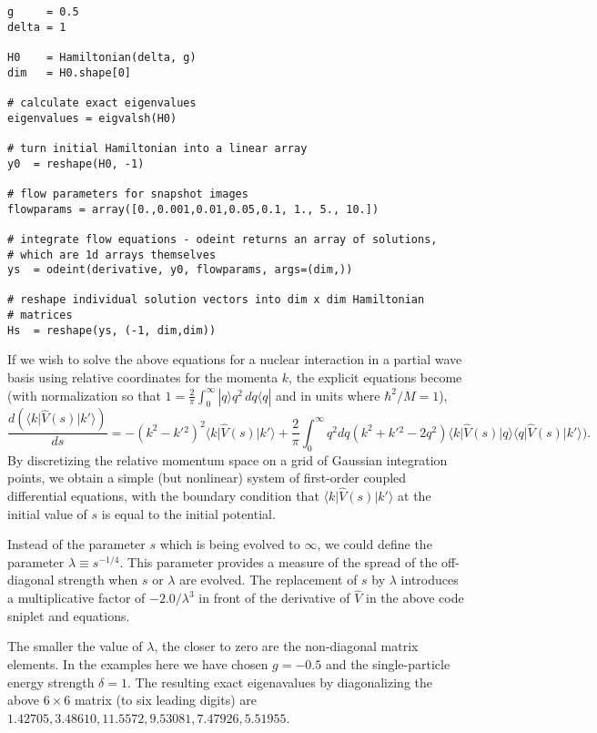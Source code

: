 \begin{lstlisting}
g     = 0.5
delta = 1

H0    = Hamiltonian(delta, g)
dim   = H0.shape[0]

# calculate exact eigenvalues
eigenvalues = eigvalsh(H0)

# turn initial Hamiltonian into a linear array
y0  = reshape(H0, -1)                 

# flow parameters for snapshot images
flowparams = array([0.,0.001,0.01,0.05,0.1, 1., 5., 10.])

# integrate flow equations - odeint returns an array of solutions,
# which are 1d arrays themselves
ys  = odeint(derivative, y0, flowparams, args=(dim,))

# reshape individual solution vectors into dim x dim Hamiltonian
# matrices
Hs  = reshape(ys, (-1, dim,dim))
\end{lstlisting}

If we wish to solve the above equations for a nuclear interaction in a
partial wave basis using relative coordinates for the momenta $k$, the explicit equations
become \cite{Bogner:2007od} (with normalization
so that $1 = \frac{2}{\pi}\int_0^\infty|q\rangle q^2\,dq \langle q |$
and in units where $\hbar^2/M = 1$),
%
\begin{equation}
  \frac{d(\langle k \vert \hat{V}(s) \vert k'\rangle)}{ds} =- (k^2 - k'{}^2)^2\langle k \vert \hat{V}(s) \vert k'\rangle
    + \frac{2}{\pi}\int_0^{\infty}q^2dq
      (k^2 + k'{}^2 - 2q^2)\langle k \vert \hat{V}(s) \vert q\rangle\langle q \vert \hat{V}(s) \vert k'\rangle).
\end{equation}
By discretizing the relative momentum space on a grid of Gaussian integration points, 
we obtain a simple (but nonlinear) system of first-order
coupled differential equations,
with the boundary condition that $\langle k \vert \hat{V}(s) \vert k'\rangle$ at the initial
value of $s$ is equal to the initial potential.

Instead of the parameter $s$ which is being evolved to $\infty$, we could define 
the parameter $\lambda \equiv s^{-1/4}$. This parameter  provides a measure of the
spread of the off-diagonal strength when $s$ or $\lambda$ are evolved. The replacement of $s$ by $\lambda$ introduces a multiplicative factor 
of $-2.0/\lambda^3$ in front of the derivative of $\hat{V}$ in the above code sniplet and equations. 

\tbd{[...]}

The smaller the value of $\lambda$, the closer to zero are the non-diagonal matrix elements. 
In the examples here we have chosen 
$g=-0.5$ and the single-particle energy strength $\delta=1$. The resulting exact eigenavalues by diagonalizing the above $6\times 6$ matrix (to six leading digits) are
$1.42705,   3.48610,  11.5572,   9.53081, 7.47926,   5.51955$.

